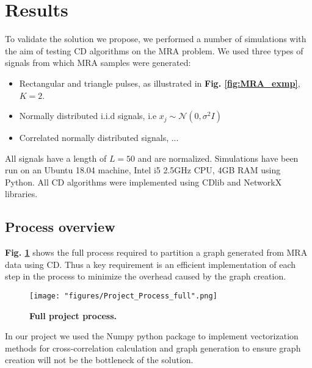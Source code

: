 \center

\section{Results}

\raggedright

To validate the solution we propose, we performed a number of simulations with the aim of testing \acrshort{CD} algorithms on the \acrshort{MRA} problem. We used three types of signals from which \acrshort{MRA} samples were generated:

\begin{itemize}
\item Rectangular and triangle pulses, as illustrated in \textbf{Fig. \ref{fig:MRA_exmp}}, $K =2$.

\item Normally distributed i.i.d signals, i.e $x_j \sim \mathcal{N}(0,\sigma^2I)$

\item Correlated normally distributed signals, ... 
\end{itemize}
All signals have a length of $L=50$ and are normalized.
Simulations have been run on an Ubuntu 18.04 machine, Intel i5 2.5GHz CPU, 4GB RAM using Python. All \acrshort{CD} algorithms were implemented using CDlib and NetworkX libraries.

\subsection{Process overview}
\textbf{Fig. \ref{fig:full_process}} shows the full process required to partition a graph generated from \acrshort{MRA} data using \acrlong{CD}. Thus a key requirement is an efficient implementation of each step in the process to minimize the overhead caused by the graph creation.

\begin{figure}[h]
  \centering
  \texttt{[image: "figures/Project\_Process\_full".png]}
  \caption{\textbf{Full project process.}}
  \label{fig:full_process}
\end{figure}

In our project we used the Numpy python package to implement vectorization methods for cross-correlation calculation and graph generation to ensure graph creation will not be the bottleneck of the solution.

